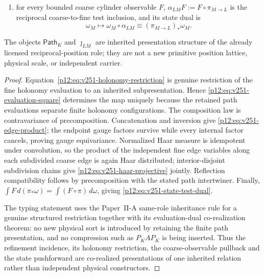 \documentclass[12pt,a4paper]{article}
\begin{document}
\begin{theorem}
\begin{enumerate}[label=\textnormal{(\roman*)},leftmargin=3em]
$\jmath_{LM}\Theta_L=\Theta_M\jmath_{LM}$, then
$\pi_{M\to L}\Theta_M=\Theta_L\pi_{M\to L}$;
\item for every bounded coarse cylinder observable $F$,
$\alpha_{LM}F:=F\circ\pi_{M\to L}$ is the reciprocal coarse-to-fine test
inclusion, and its state dual is
\begin{equation}
\label{p12:eq:v251-state-test-dual}
 \omega_M\longmapsto\omega_M\circ\alpha_{LM}
 \equiv (\pi_{M\to L})_*\omega_M .
\end{equation}
\end{enumerate}
The objects $\mathsf{Path}_K$ and $\jmath_{LM}$ are inherited presentation
structure of the already licensed reciprocal-position role; they are not a
new primitive position lattice, physical scale, or independent carrier.
\end{theorem}
\begin{proof}
Equation~\eqref{p12:eq:v251-holonomy-restriction} is genuine restriction of
the fine holonomy evaluation to an inherited subpresentation.  Hence
\eqref{p12:eq:v251-evaluation-square} determines the map uniquely because the
retained path evaluations separate finite holonomy configurations.  The
composition law is contravariance of precomposition.  Concatenation and
inversion give \eqref{p12:eq:v251-edge-product}; the endpoint gauge factors
survive while every internal factor cancels, proving gauge equivariance.
Normalized Haar measure is idempotent under convolution, so the product of
the independent fine edge variables along each subdivided coarse edge is
again Haar distributed; interior-disjoint subdivision chains give
\eqref{p12:eq:v251-haar-projective} jointly.  Reflection compatibility follows
by precomposition with the stated path intertwiner.  Finally,
$\int F\,d(\pi_*\omega)=\int(F\circ\pi)\,d\omega$, giving
\eqref{p12:eq:v251-state-test-dual}.

The typing statement uses the Paper~II-A same-role inheritance rule for a
genuine structured restriction together with its evaluation-dual
co-realization theorem: no new physical sort is introduced by retaining the
finite path presentation, and no compression such as $P_KAP_K$ is being
inserted.  Thus the refinement incidence, its holonomy restriction, the
coarse-observable pullback and the state pushforward are co-realized
presentations of one inherited relation rather than independent physical
constructors.
\end{proof}
\end{document}
